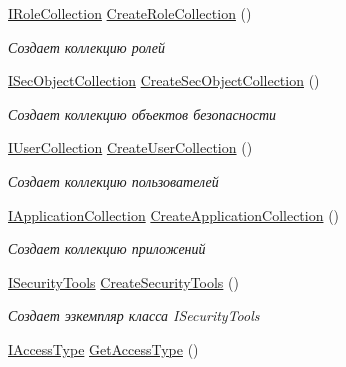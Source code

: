 \begin{DoxyCompactItemize}
\hyperlink{interface_security_1_1_interfaces_1_1_collections_1_1_i_role_collection}{I\+Role\+Collection} \hyperlink{class_security_1_1_entity_framework_1_1_security_factory_aec7cc1f83c7aed01e98f853a5ddf618e}{Create\+Role\+Collection} ()
\begin{DoxyCompactList}\small\item\em Создает коллекцию ролей \end{DoxyCompactList}\item 
\hyperlink{interface_security_1_1_interfaces_1_1_collections_1_1_i_sec_object_collection}{I\+Sec\+Object\+Collection} \hyperlink{class_security_1_1_entity_framework_1_1_security_factory_a6b5b70d573343faaf80fe95ff0e52ced}{Create\+Sec\+Object\+Collection} ()
\begin{DoxyCompactList}\small\item\em Создает коллекцию объектов безопасности \end{DoxyCompactList}\item 
\hyperlink{interface_security_1_1_interfaces_1_1_collections_1_1_i_user_collection}{I\+User\+Collection} \hyperlink{class_security_1_1_entity_framework_1_1_security_factory_a9b16e937fcec0adc84622f5823d83a30}{Create\+User\+Collection} ()
\begin{DoxyCompactList}\small\item\em Создает коллекцию пользователей \end{DoxyCompactList}\item 
\hyperlink{interface_security_1_1_interfaces_1_1_collections_1_1_i_application_collection}{I\+Application\+Collection} \hyperlink{class_security_1_1_entity_framework_1_1_security_factory_a7aa2131411cce5dd03bdea9e615be18d}{Create\+Application\+Collection} ()
\begin{DoxyCompactList}\small\item\em Создает коллекцию приложений \end{DoxyCompactList}\item 
\hyperlink{interface_security_1_1_interfaces_1_1_i_security_tools}{I\+Security\+Tools} \hyperlink{class_security_1_1_entity_framework_1_1_security_factory_a7d14f76fcb34ef137f2d4f425585d5ee}{Create\+Security\+Tools} ()
\begin{DoxyCompactList}\small\item\em Создает эзкемпляр класса I\+Security\+Tools \end{DoxyCompactList}\item 
\hyperlink{interface_security_1_1_interfaces_1_1_model_1_1_i_access_type}{I\+Access\+Type} \hyperlink{class_security_1_1_entity_framework_1_1_security_factory_ad96cae2f018cdbb3245b2c00c0f37db2}{Get\+Access\+Type} ()

\end{DoxyCompactItemize}
